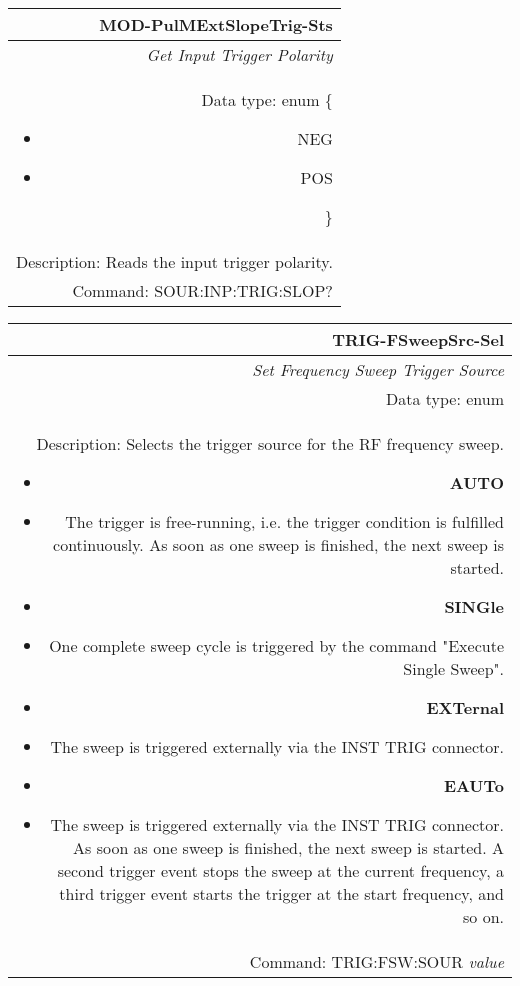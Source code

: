 \documentclass[openany]{article}
\begin{document}
		\begin{tabular}{N}
			\hline
			\bfseries MOD-PulMExtSlopeTrig-Sts \\ \hline
			\emph{Get Input Trigger Polarity} \\
			Data type: enum \{\begin{itemize}[noitemsep]
				\small
				\item[] NEG
				\item[] POS
			\end{itemize}\} \\ 
			Description: Reads the input trigger polarity. \\
			Command: SOUR:INP:TRIG:SLOP? \\

		\end{tabular}
%
		\begin{tabular}{N}
			\hline
			\bfseries TRIG-FSweepSrc-Sel \\ \hline
			\emph{Set Frequency Sweep Trigger Source} \\
			Data type: enum \\   
			Description: Selects the trigger source for the RF frequency sweep.\begin{itemize}[noitemsep]
				\small
				\item[] \textbf{AUTO}
				\item[] The trigger is free-running, i.e. the trigger condition is fulfilled continuously. As soon as one sweep is finished, the next sweep is started.
                                \item[] \textbf{SINGle}
				\item[] One complete sweep cycle is triggered by the command "Execute Single Sweep".
				\item[] \textbf{EXTernal}
				\item[] The sweep is triggered externally via the INST TRIG connector.
                                \item[] \textbf{EAUTo}
				\item[] The sweep is triggered externally via the INST TRIG connector. As soon as one sweep is finished, the next sweep is started. A second trigger event stops the sweep at the current frequency, a third trigger event starts the trigger at the start frequency, and so on.

			\end{itemize} \\
			Command: TRIG:FSW:SOUR \emph{value} \\

		\end{tabular}
\end{document}
